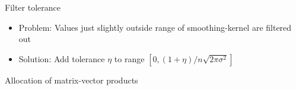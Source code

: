 \documentclass[aspectratio=169, leqno, 12pt]{beamer}
\begin{document}
\begin{frame}{Filter tolerance}
    \begin{itemize}
        \item Problem: Values just slightly outside range of \gls{smoothing-kernel} are filtered out%
        \item Solution: Add tolerance $\eta$ to range $[0, (1 + \eta)/n\sqrt{2\pi\sigma^2}]$
    \end{itemize}
    \centering
    \scalebox{0.8}{}
\end{frame}

\begin{frame}{Allocation of matrix-vector products}
    
\end{frame}
\end{document}
